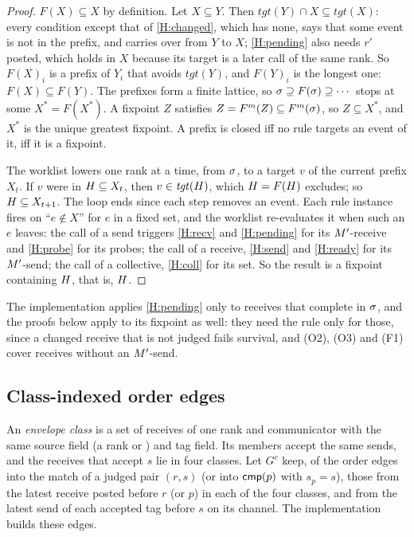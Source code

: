 \begin{proof}
$F(X)\subseteq X$ by definition. Let $X\subseteq Y$. Then $\mathit{tgt}(Y)\cap X\subseteq \mathit{tgt}(X)$: every
condition except that of \ref{H:changed}, which has none, says that some event is not in the
prefix, and carries over from $Y$ to $X$; \ref{H:pending} also needs $r'$ posted, which holds in
$X$ because its target is a later call of the same rank. So $F(X)_i$ is a prefix of $Y_i$ that
avoids $\mathit{tgt}(Y)$, and $F(Y)_i$ is the longest one: $F(X)\subseteq F(Y)$. The prefixes form a finite
lattice, so $\sigma\supseteq F(\sigma)\supseteq\cdots$ stops at some $X^*=F(X^*)$. A fixpoint
$Z$ satisfies $Z=F^m(Z)\subseteq F^m(\sigma)$, so $Z\subseteq X^*$, and $X^*$ is the unique
greatest fixpoint. A prefix is closed iff no rule targets an event of it, iff it is a
fixpoint.

The worklist lowers one rank at a time, from $\sigma$, to a target $v$ of the current
prefix $X_t$. If $v$ were in $H\subseteq X_t$, then $v\in \mathit{tgt}(H)$, which $H=F(H)$
excludes; so $H\subseteq X_{t+1}$. The loop ends since each step removes an event. Each rule
instance fires on ``$e\notin X$'' for $e$ in a fixed set, and the worklist re-evaluates it when
such an $e$ leaves: the call of a send triggers \ref{H:recv} and \ref{H:pending} for its
$M'$-receive and \ref{H:probe} for its probes; the call of a receive, \ref{H:send} and
\ref{H:ready} for its $M'$-send; the call of a collective, \ref{H:coll} for its set. So the
result is a fixpoint containing $H$, that is, $H$.
\end{proof}

The implementation applies \ref{H:pending} only to receives that complete in $\sigma$, and the
proofs below apply to its fixpoint as well: they need the rule only for those, since a changed
receive that is not judged fails survival, and (O2), (O3) and (F1) cover receives without an
$M'$-send.

\subsection{Class-indexed order edges}
\label{app:chain}

An \emph{envelope class} is a set of receives of one rank and communicator with the same source
field (a rank or \ANY) and tag field. Its members accept the same sends, and the receives that
accept $s$ lie in four classes. Let $G^{c}$ keep, of the order edges into the match of a judged
pair $(r,s)$ (or into $\mathsf{cmp}(p)$ with $s_p=s$), those from the latest receive posted before $r$
(or $p$) in each of the four classes, and from the latest send of each accepted tag before $s$
on its channel. The implementation builds these edges.

